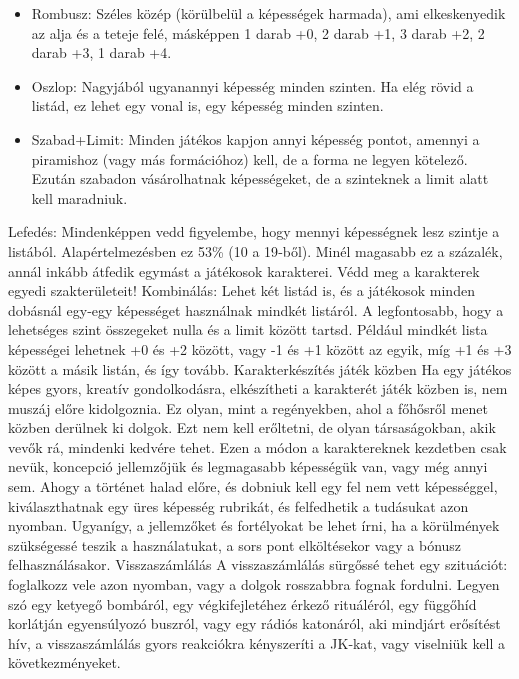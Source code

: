 \documentclass[oneside]{book}
\begin{document}
\begin{itemize}
    \item Rombusz: Széles közép (körülbelül a képességek harmada), ami elkeskenyedik az alja és a teteje felé, másképpen 1 darab +0, 2 darab +1, 3 darab +2, 2 darab +3, 1 darab +4.
    \item Oszlop: Nagyjából ugyanannyi képesség minden szinten. Ha elég rövid a listád, ez lehet egy vonal is, egy képesség minden szinten.
    \item Szabad+Limit: Minden játékos kapjon annyi képesség pontot, amennyi a piramishoz (vagy más formációhoz) kell, de a forma ne legyen kötelező. Ezután szabadon vásárolhatnak képességeket, de a szinteknek a limit alatt kell maradniuk.
\end{itemize}

Lefedés: Mindenképpen vedd figyelembe, hogy mennyi képességnek lesz szintje a listából. Alapértelmezésben ez 53\% (10 a 19‑ből). Minél magasabb ez a százalék, annál inkább átfedik egymást a játékosok karakterei. Védd meg a karakterek egyedi szakterületeit!
Kombinálás: Lehet két listád is, és a játékosok minden dobásnál egy‑egy képességet használnak mindkét listáról. A legfontosabb, hogy a lehetséges szint összegeket nulla és a limit között tartsd. Például mindkét lista képességei lehetnek +0 és +2 között, vagy -1 és +1 között az egyik, míg +1 és +3 között a másik listán, és így tovább.
Karakterkészítés játék közben
Ha egy játékos képes gyors, kreatív gondolkodásra, elkészítheti a karakterét játék közben is, nem muszáj előre kidolgoznia. Ez olyan, mint a regényekben, ahol a főhősről menet közben derülnek ki dolgok. Ezt nem kell erőltetni, de olyan társaságokban, akik vevők rá, mindenki kedvére tehet.
Ezen a módon a karaktereknek kezdetben csak nevük, koncepció jellemzőjük és legmagasabb képességük van, vagy még annyi sem. Ahogy a történet halad előre, és dobniuk kell egy fel nem vett képességgel, kiválaszthatnak egy üres képesség rubrikát, és felfedhetik a tudásukat azon nyomban. Ugyanígy, a jellemzőket és fortélyokat be lehet írni, ha a körülmények szükségessé teszik a használatukat, a sors pont elköltésekor vagy a bónusz felhasználásakor.
Visszaszámlálás
A visszaszámlálás sürgőssé tehet egy szituációt: foglalkozz vele azon nyomban, vagy a dolgok rosszabbra fognak fordulni. Legyen szó egy ketyegő bombáról, egy végkifejletéhez érkező rituáléról, egy függőhíd korlátján egyensúlyozó buszról, vagy egy rádiós katonáról, aki mindjárt erősítést hív, a visszaszámlálás gyors reakciókra kényszeríti a JK‑kat, vagy viselniük kell a következményeket.
\end{document}
